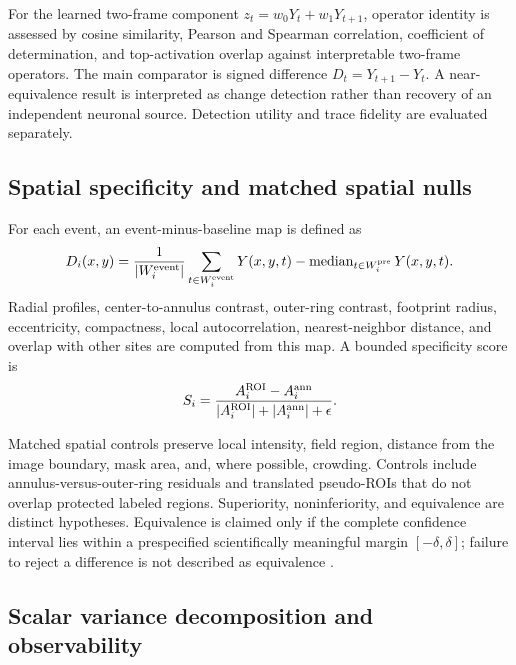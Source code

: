 For the learned two-frame component $z_t=w_0Y_t+w_1Y_{t+1}$, operator identity is assessed by cosine similarity, Pearson and Spearman correlation, coefficient of determination, and top-activation overlap against interpretable two-frame operators. The main comparator is signed difference $D_t=Y_{t+1}-Y_t$. A near-equivalence result is interpreted as change detection rather than recovery of an independent neuronal source. Detection utility and trace fidelity are evaluated separately.

\subsection{Spatial specificity and matched spatial nulls}
\label{sec:spatial-methods}

For each event, an event-minus-baseline map is defined as
\begin{equation}
  D_i(x,y)=\frac{1}{|W_i^{\mathrm{event}}|}\sum_{t\in W_i^{\mathrm{event}}}Y(x,y,t)
  -\operatorname{median}_{t\in W_i^{\mathrm{pre}}}Y(x,y,t).
\end{equation}
Radial profiles, center-to-annulus contrast, outer-ring contrast, footprint radius, eccentricity, compactness, local autocorrelation, nearest-neighbor distance, and overlap with other sites are computed from this map. A bounded specificity score is
\begin{equation}
  S_i=\frac{A_i^{\mathrm{ROI}}-A_i^{\mathrm{ann}}}
  {|A_i^{\mathrm{ROI}}|+|A_i^{\mathrm{ann}}|+\epsilon}.
\end{equation}

Matched spatial controls preserve local intensity, field region, distance from the image boundary, mask area, and, where possible, crowding. Controls include annulus-versus-outer-ring residuals and translated pseudo-ROIs that do not overlap protected labeled regions. Superiority, noninferiority, and equivalence are distinct hypotheses. Equivalence is claimed only if the complete confidence interval lies within a prespecified scientifically meaningful margin $[-\delta,\delta]$; failure to reject a difference is not described as equivalence \citep{lakens2017equivalence}.

\subsection{Scalar variance decomposition and observability}
\label{sec:scalar-models}

